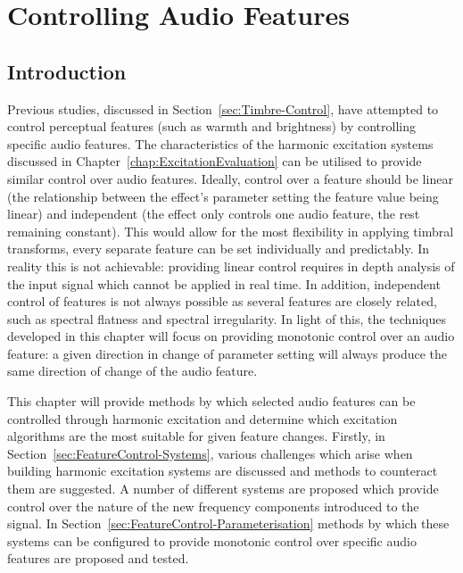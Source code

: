 
\chapter{Controlling Audio Features} %
\label{chap:FeatureControl}

\section{Introduction}
\label{sec:FeatureControl-Introduction}
	Previous studies, discussed in Section~\ref{sec:Timbre-Control}, have attempted to control perceptual features
	(such as warmth and brightness) by controlling specific audio features. The characteristics of the harmonic
	excitation systems discussed in Chapter~\ref{chap:ExcitationEvaluation} can be utilised to provide similar control
	over audio features. Ideally, control over a feature should be linear (the relationship between the effect's
	parameter setting the feature value being linear) and independent (the effect only controls one audio feature, the
	rest remaining constant). This would allow for the most flexibility in applying timbral transforms, every separate
	feature can be set individually and predictably. In reality this is not achievable: providing linear control
	requires in depth analysis of the input signal which cannot be applied in real time. In addition, independent
	control of features is not always possible as several features are closely related, such as spectral flatness and
	spectral irregularity. In light of this, the techniques developed in this chapter will focus on providing monotonic
	control over an audio feature: a given direction in change of parameter setting will always produce the same
	direction of change of the audio feature.
	
	This chapter will provide methods by which selected audio features can be controlled through harmonic excitation
	and determine which excitation algorithms are the most suitable for given feature changes. Firstly, in
	Section~\ref{sec:FeatureControl-Systems}, various challenges which arise when building harmonic excitation systems
	are discussed and methods to counteract them are suggested. A number of different systems are proposed which
	provide control over the nature of the new frequency components introduced to the signal. In
	Section~\ref{sec:FeatureControl-Parameterisation} methods by which these systems can be configured to provide
	monotonic control over specific audio features are proposed and tested.

